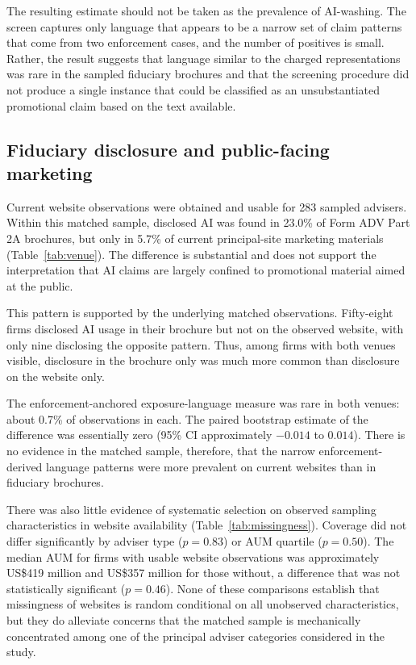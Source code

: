 \documentclass[utf8]{FrontiersinHarvard}
\begin{document}
The resulting estimate should not be taken as the prevalence of AI-washing. The screen captures only language that appears to be a narrow set of claim patterns that come from two enforcement cases, and the number of positives is small. Rather, the result suggests that language similar to the charged representations was rare in the sampled fiduciary brochures and that the screening procedure did not produce a single instance that could be classified as an unsubstantiated promotional claim based on the text available.

\subsection{Fiduciary disclosure and public-facing marketing}

Current website observations were obtained and usable for 283 sampled advisers. Within this matched sample, disclosed AI was found in 23.0\% of Form ADV Part 2A brochures, but only in 5.7\% of current principal-site marketing materials (Table~\ref{tab:venue}). The difference is substantial and does not support the interpretation that AI claims are largely confined to promotional material aimed at the public.

This pattern is supported by the underlying matched observations. Fifty-eight firms disclosed AI usage in their brochure but not on the observed website, with only nine disclosing the opposite pattern. Thus, among firms with both venues visible, disclosure in the brochure only was much more common than disclosure on the website only.

The enforcement-anchored exposure-language measure was rare in both venues: about 0.7\% of observations in each. The paired bootstrap estimate of the difference was essentially zero (95\% CI approximately $-0.014$ to $0.014$). There is no evidence in the matched sample, therefore, that the narrow enforcement-derived language patterns were more prevalent on current websites than in fiduciary brochures.

There was also little evidence of systematic selection on observed sampling characteristics in website availability (Table~\ref{tab:missingness}). Coverage did not differ significantly by adviser type ($p = 0.83$) or AUM quartile ($p = 0.50$). The median AUM for firms with usable website observations was approximately US\$419 million and US\$357 million for those without, a difference that was not statistically significant ($p = 0.46$). None of these comparisons establish that missingness of websites is random conditional on all unobserved characteristics, but they do alleviate concerns that the matched sample is mechanically concentrated among one of the principal adviser categories considered in the study.
\end{document}
